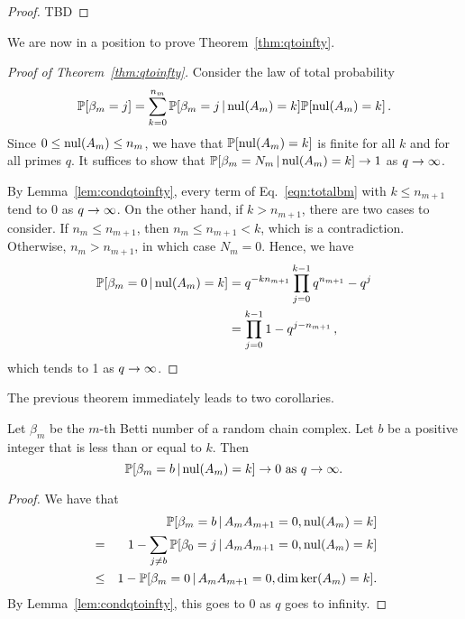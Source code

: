 \begin{proof}
  TBD
\end{proof}


We are now in a position to prove Theorem~\ref{thm:qtoinfty}.

\begin{proof}[Proof of Theorem~\ref{thm:qtoinfty}]
  Consider the law of total probability
  \begin{equation}
    \label{eqn:totalbm}
    \mathbb{P}[\beta_m = j] = \sum_{k=0}^{n_m} \mathbb{P}[\beta_m = j \,|\, \mathrm{nul}(A_m) = k]
    \mathbb{P}[\mathrm{nul}(A_m) = k] \, .
  \end{equation}
   Since $0 \leq \mathrm{nul}(A_m) \leq n_m$, we have that $\mathbb{P}[\mathrm{nul}(A_m) = k]$ is
   finite for all $k$ and for all primes $q$.  It suffices to show that 
   $\mathbb{P}[\beta_m =N_m \,|\, \mathrm{nul}(A_m) = k] \rightarrow 1$ as $q \rightarrow \infty$.
   
   By Lemma~\ref{lem:condqtoinfty}, every
   term of Eq.~\eqref{eqn:totalbm} with $k\leq n_{m+1}$ tend to 0 as $q \rightarrow \infty$.
   On the other hand, if $k>n_{m+1}$, there are two cases to consider.
   If $n_m \leq n_{m+1}$, then $n_m \leq n_{m+1} < k$, which is a contradiction.
   Otherwise, $n_m > n_{m+1}$, in which case $N_m = 0$. Hence, we have
   \begin{align*}
     \mathbb{P}[\beta_m = 0 \,|\, \mathrm{nul}(A_m) = k] &= q^{-k n_{m+1}} \prod_{j=0}^{k-1}q^{n_{m+1}}-q^j \\
     &= \prod_{j=0}^{k-1} 1 - q^{j-n_{m+1}} \, ,
   \end{align*}
   which tends to 1 as $q \rightarrow \infty$.
 \end{proof}




  



The previous theorem immediately leads to two corollaries.  

\begin{corollary}\label{condtozero}
Let $\beta_m$ be the $m$-th Betti number of a random chain complex. Let $b$ be a positive integer that is less than or equal to $k$. Then 
\[
\mathbb{P}[\beta_m = b \,|\, \mathrm{nul}(A_{m}) = k ] \to 0 \textrm{ as } q\to\infty.
\]
\end{corollary}
\begin{proof}
We have that
	\begin{eqnarray*}
	&&\mathbb{P}[\beta_m = b \,|\, A_{m}A_{m+1} = 0, \mathrm{nul}(A_{m}) = k ]\\
    &=& 1 - \sum_{j\neq b}\mathbb{P}[\beta_0 = j \,|\, A_{m}A_{m+1} = 0, \mathrm{nul}(A_{m}) = k ]\\
    &\leq& 1 - \mathbb{P}[\beta_m = 0 \,|\, A_{m}A_{m+1} = 0, \dim\ker(A_{m}) = k ].
	\end{eqnarray*}
By Lemma~\ref{lem:condqtoinfty}, this goes to $0$ as $q$ goes to infinity.
\end{proof}

